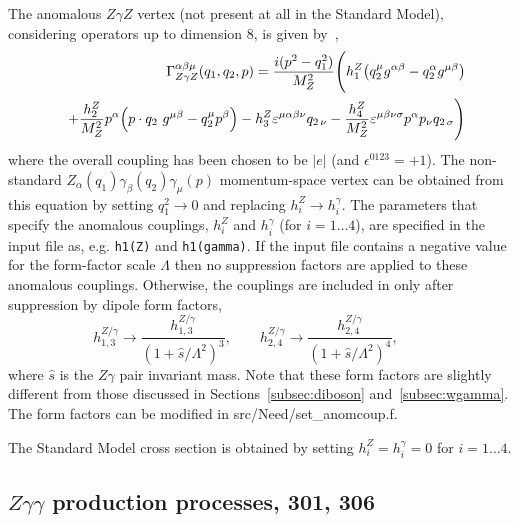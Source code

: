 \documentclass{article}
\begin{document}
{{{{{{The anomalous $Z\gamma Z$ vertex (not present at all in the Standard Model),
considering operators up to dimension 8, is given by~\cite{DeFlorian:2000sg},
\begin{eqnarray}
 && \Gamma^{\alpha \beta \mu}_{Z \gamma Z}(q_1, q_2, p) = 
   \frac{i(p^2-q_1^2)}{M_Z^2} \Biggl( 
   h_1^Z \bigl( q_2^\mu g^{\alpha\beta} - q_2^\alpha g^{\mu \beta}
   \bigr)
    \nonumber \\ && + \frac{h_2^Z}{M_Z^2} p^\alpha \Bigl( p\cdot q_2\ g^{\mu\beta} -
            q_2^\mu p^\beta \Bigr)
   - h_3^Z \varepsilon^{\mu\alpha\beta\nu} q_{2\, \nu} 
   - \frac{h_4^Z}{M_Z^2} \varepsilon^{\mu\beta\nu\sigma} p^\alpha
p_\nu q_{2\, \sigma} \Biggl)
\end{eqnarray}
where the overall coupling has been chosen to be $|e|$ (and
$\epsilon^{0123}=+1$). The non-standard $Z_\alpha(q_1) \gamma_\beta(q_2)
\gamma_\mu(p)$ momentum-space vertex can be obtained from
this equation by setting $q_1^2 \to 0$ and replacing $h_i^Z \to
h_i^\gamma$. 
The parameters that
specify the anomalous couplings, $h_i^Z$ and $h_i^\gamma$ (for $i=1\ldots 4$), are
specified in the input file as, e.g. {\tt h1(Z)} and {\tt h1(gamma)}.
If the input file contains a negative value for the form-factor scale $\Lambda$
then no suppression factors are applied to these anomalous couplings.
Otherwise, the couplings are included
in \MCFM only after suppression by dipole form factors,
\begin{displaymath}
h_{1,3}^{Z/\gamma} \rightarrow
 \frac{h_{1,3}^{Z/\gamma}}{(1+\hat{s}/\Lambda^2)^3}, \qquad
h_{2,4}^{Z/\gamma} \rightarrow
 \frac{h_{2,4}^{Z/\gamma}}{(1+\hat{s}/\Lambda^2)^4}, \qquad
\end{displaymath}
where $\hat{s}$ is the $Z\gamma$ pair invariant mass. Note that these form factors are slightly
different from those discussed in Sections~\ref{subsec:diboson} and~\ref{subsec:wgamma}. The
form factors can be modified in {\ttfamily src/Need/set\_anomcoup.f}.

The Standard Model cross section is obtained by setting $h_i^Z = h_i^\gamma = 0$ for $i=1\ldots 4$.

\subsection{$Z\gamma\gamma$ production processes, 301, 306} 

}}}}}}
\end{document}

